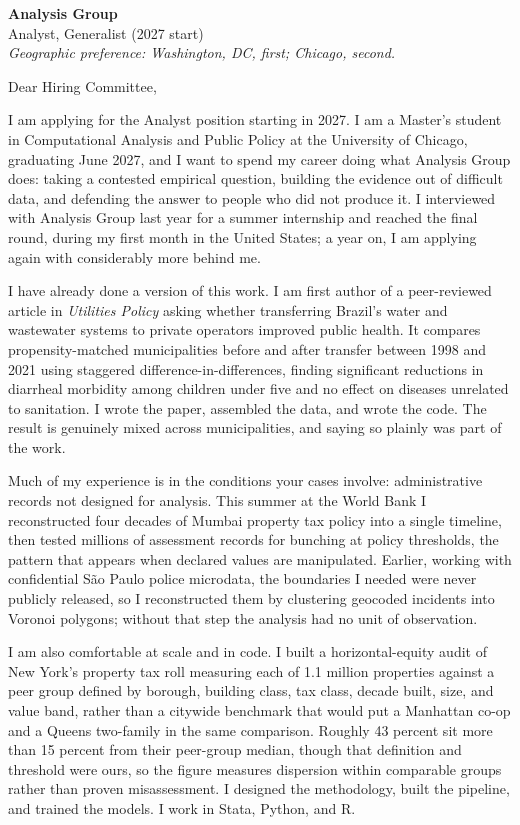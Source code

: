 


\textbf{Analysis Group} \\
Analyst, Generalist (2027 start) \\
\textit{Geographic preference: Washington, DC, first; Chicago, second.}

\vspace{8pt}

Dear Hiring Committee,

I am applying for the Analyst position starting in 2027. I am a Master's student in Computational Analysis and Public Policy at the University of Chicago, graduating June 2027, and I want to spend my career doing what Analysis Group does: taking a contested empirical question, building the evidence out of difficult data, and defending the answer to people who did not produce it. I interviewed with Analysis Group last year for a summer internship and reached the final round, during my first month in the United States; a year on, I am applying again with considerably more behind me.

I have already done a version of this work. I am first author of a peer-reviewed article in \textit{Utilities Policy} asking whether transferring Brazil's water and wastewater systems to private operators improved public health. It compares propensity-matched municipalities before and after transfer between 1998 and 2021 using staggered difference-in-differences, finding significant reductions in diarrheal morbidity among children under five and no effect on diseases unrelated to sanitation. I wrote the paper, assembled the data, and wrote the code. The result is genuinely mixed across municipalities, and saying so plainly was part of the work.

Much of my experience is in the conditions your cases involve: administrative records not designed for analysis. This summer at the World Bank I reconstructed four decades of Mumbai property tax policy into a single timeline, then tested millions of assessment records for bunching at policy thresholds, the pattern that appears when declared values are manipulated. Earlier, working with confidential São Paulo police microdata, the boundaries I needed were never publicly released, so I reconstructed them by clustering geocoded incidents into Voronoi polygons; without that step the analysis had no unit of observation.

I am also comfortable at scale and in code. I built a horizontal-equity audit of New York's property tax roll measuring each of 1.1 million properties against a peer group defined by borough, building class, tax class, decade built, size, and value band, rather than a citywide benchmark that would put a Manhattan co-op and a Queens two-family in the same comparison. Roughly 43 percent sit more than 15 percent from their peer-group median, though that definition and threshold were ours, so the figure measures dispersion within comparable groups rather than proven misassessment. I designed the methodology, built the pipeline, and trained the models. I work in Stata, Python, and R.

